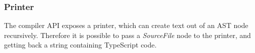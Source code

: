 \subsubsection{Printer}

The compiler API exposes a printer, which can create text out of an AST node recursively. Therefore it is possible to pass a \emph{SourceFile} node to the printer, and getting back a string containing TypeScript code.





